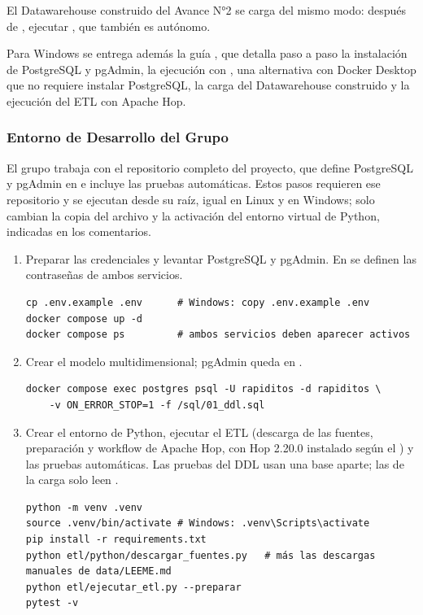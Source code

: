 El Datawarehouse construido del Avance N°2 se carga del mismo modo: después
de , ejecutar , que también es autónomo.

Para Windows se entrega además la guía , que
detalla paso a paso la instalación de PostgreSQL y pgAdmin, la ejecución con
, una alternativa con Docker Desktop que no requiere instalar
PostgreSQL, la carga del Datawarehouse construido y la ejecución del ETL con
Apache Hop.

\subsubsection{Entorno de Desarrollo del Grupo}

El grupo trabaja con el repositorio completo del proyecto, que define
PostgreSQL y pgAdmin en  e incluye las pruebas
automáticas. Estos pasos requieren ese repositorio y se ejecutan desde su
raíz, igual en Linux y en Windows; solo cambian la copia del archivo
 y la activación del entorno virtual de Python, indicadas en los
comentarios.

\begin{enumerate}[leftmargin=*]
  \item Preparar las credenciales y levantar PostgreSQL y pgAdmin. En
         se definen las contraseñas de ambos servicios.
\begin{lstlisting}[style=consola]
cp .env.example .env      # Windows: copy .env.example .env
docker compose up -d
docker compose ps         # ambos servicios deben aparecer activos
\end{lstlisting}
  \item Crear el modelo multidimensional; pgAdmin queda en
        .
\begin{lstlisting}[style=consola]
docker compose exec postgres psql -U rapiditos -d rapiditos \
    -v ON_ERROR_STOP=1 -f /sql/01_ddl.sql
\end{lstlisting}
  \item Crear el entorno de Python, ejecutar el ETL (descarga de las fuentes,
        preparación y workflow de Apache Hop, con Hop 2.20.0 instalado según
        el \bd{README.md}) y las pruebas automáticas. Las pruebas del DDL usan
        una base aparte; las de la carga solo leen \bd{rapiditos}.
\begin{lstlisting}[style=consola]
python -m venv .venv
source .venv/bin/activate # Windows: .venv\Scripts\activate
pip install -r requirements.txt
python etl/python/descargar_fuentes.py   # más las descargas manuales de data/LEEME.md
python etl/ejecutar_etl.py --preparar
pytest -v
\end{lstlisting}
\end{enumerate}

